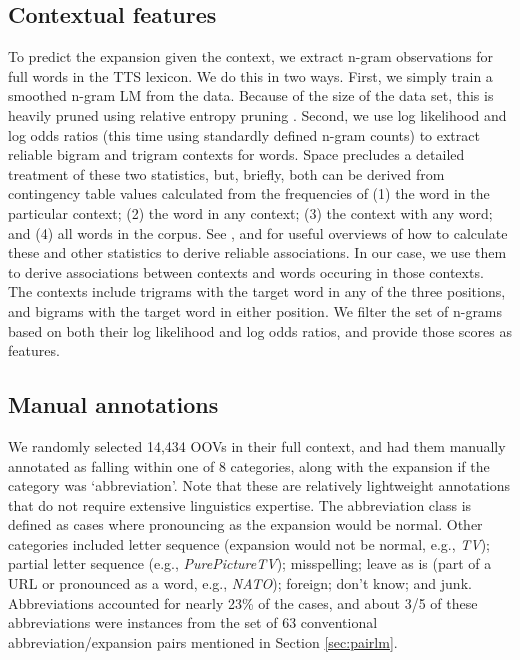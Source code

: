 \documentclass[11pt]{article}
\begin{document}
\subsection{Contextual features}\label{sec:context}
To predict the expansion given the context, we extract n-gram
observations for full words in the TTS lexicon. We do this in two
ways. First, we simply train a smoothed n-gram LM from the
data. Because of the size of the data set, this is heavily pruned
using relative entropy pruning \cite{Stolcke98}.  Second, we use log
likelihood and log odds ratios (this time using standardly defined
n-gram counts) to extract reliable bigram and trigram contexts 
for words.  Space precludes a detailed treatment of these two
statistics, but, briefly, both can be derived from contingency table
values calculated from the frequencies of (1) the
word in the particular context; (2) the word in any context; (3) the
context with any word; and (4) all words in the corpus.  See ,
 and  for useful overviews of
how to calculate these and other statistics to derive reliable associations.  In our
case, we use them to derive associations between contexts and words occuring in
those contexts.  The contexts include trigrams with the target word
in any of the three positions, and bigrams with the target word in either
position.  We filter the set of n-grams based on both their log likelihood and
log odds ratios, and provide those scores as features.

\vspace{-0.2cm}
\subsection{Manual annotations}
We randomly selected 14,434 OOVs in their full context, and had them manually
annotated as falling within one of 8 categories, along with the expansion if the
category was `abbreviation'.  Note that these are relatively
lightweight annotations that do not require extensive linguistics expertise.
The abbreviation class is defined as cases where
pronouncing as the expansion would be normal.  Other categories included letter
sequence (expansion would not be normal, e.g., \emph{TV}); partial letter
sequence (e.g., \emph{ PurePictureTV}); misspelling; leave as is (part of a URL
or pronounced as a word, e.g., \emph{ NATO}); foreign; don't know; and junk.
Abbreviations accounted for nearly 23\% of the cases, and about 3/5 of these
abbreviations were instances from the set of 63 conventional
abbreviation/expansion pairs mentioned in Section \ref{sec:pairlm}.
\end{document}
